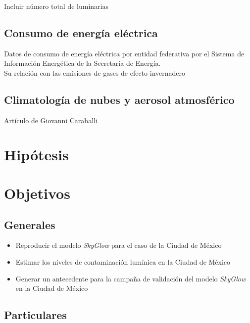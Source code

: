 Incluir número total de luminarias

\subsection{Consumo de energía eléctrica}


Datos de consumo de energía eléctrica por entidad federativa por el Sistema de Información Energética de la Secretaría de Energía.\\

Su relación con las emisiones de gases de efecto invernadero 

\subsection{Climatología de nubes y aerosol atmosférico}

Artículo de Giovanni Caraballi

\section{Hipótesis}

\section{Objetivos}

\subsection{Generales}

\begin{itemize}

    \item Reproducir el modelo \textit{SkyGlow} para el caso de la Ciudad de México
    
    \item Estimar los niveles de contaminación lumínica en la Ciudad de México 
    
    \item Generar un antecedente para la campaña de validación del modelo \textit{SkyGlow} en la Ciudad de México
    
\end{itemize}

\subsection{Particulares}

